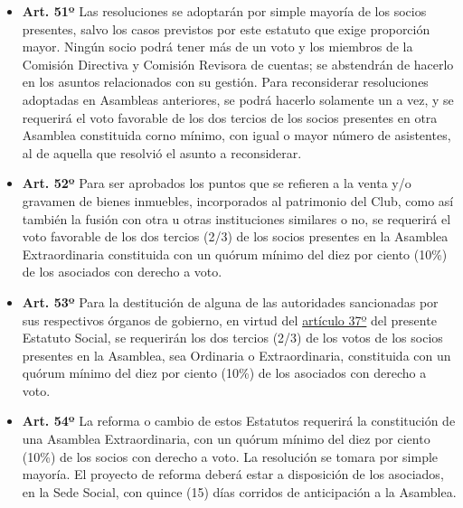 \documentclass[openany]{book}
\providecommand{\tightlist}{%
  \setlength{\itemsep}{0pt}\setlength{\parskip}{0pt}}
\begin{document}
\begin{itemize}
\tightlist
\item
  \textbf{Art. 51º}
  Las resoluciones se adoptarán por simple mayoría de los socios presentes, salvo los casos previstos por este estatuto que exige proporción mayor. Ningún socio podrá tener más de un voto y los miembros de la Comisión Directiva y Comisión Revisora de cuentas; se abstendrán de hacerlo en los asuntos relacionados con su gestión. Para reconsiderar resoluciones adoptadas en Asambleas anteriores, se podrá hacerlo solamente un a vez, y se requerirá el voto favorable de los dos tercios de los socios presentes en otra Asamblea constituida corno mínimo, con igual o mayor número de asistentes, al de aquella que resolvió el asunto a reconsiderar.
\end{itemize}

\begin{itemize}
\tightlist
\item
  \textbf{Art. 52º}
  Para ser aprobados los puntos que se refieren a la venta y/o gravamen de bienes inmuebles, incorporados al patrimonio del Club, como así también la fusión con otra u otras instituciones similares o no, se requerirá el voto favorable de los dos tercios (2/3) de los socios presentes en la Asamblea Extraordinaria constituida con un quórum mínimo del diez por ciento (10\%) de los asociados con derecho a voto.
\end{itemize}

\begin{itemize}
\tightlist
\item
  \textbf{Art. 53º}
  Para la destitución de alguna de las autoridades sancionadas por sus respectivos órganos de gobierno, en virtud del \protect\hyperlink{art37}{artículo 37º} del presente Estatuto Social, se requerirán los dos tercios (2/3) de los votos de los socios presentes en la Asamblea, sea Ordinaria o Extraordinaria, constituida con un quórum mínimo del diez por ciento (10\%) de los asociados con derecho a voto.
\end{itemize}

\begin{itemize}
\tightlist
\item
  \textbf{Art. 54º}
  La reforma o cambio de estos Estatutos requerirá la constitución de una Asamblea Extraordinaria, con un quórum mínimo del diez por ciento (10\%) de los socios con derecho a voto. La resolución se tomara por simple mayoría. El proyecto de reforma deberá estar a disposición de los asociados, en la Sede Social, con quince (15) días corridos de anticipación a la Asamblea.
\end{itemize}
\end{document}
